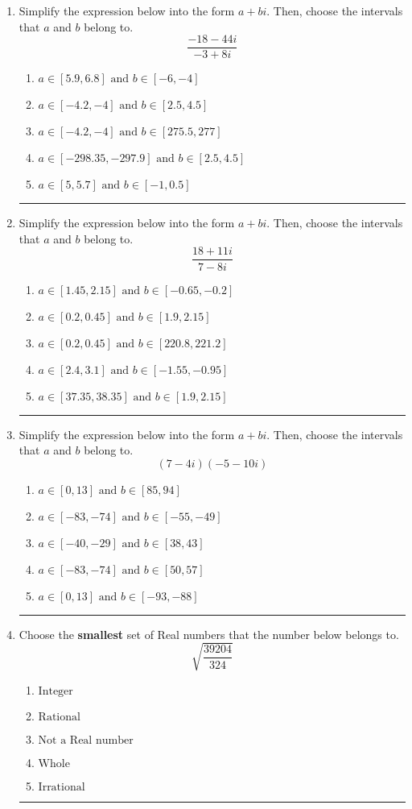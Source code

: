 \documentclass[14pt]{extbook}
\newcommand{\litem}[1]{\item#1\hspace*{-1cm}\rule{\textwidth}{0.4pt}}
\begin{document}
\begin{enumerate}
\litem{
Simplify the expression below into the form $a+bi$. Then, choose the intervals that $a$ and $b$ belong to.\[ \frac{-18 - 44 i}{-3 + 8 i} \]\begin{enumerate}[label=\Alph*.]
\item \( a \in [5.9, 6.8] \text{ and } b \in [-6, -4] \)
\item \( a \in [-4.2, -4] \text{ and } b \in [2.5, 4.5] \)
\item \( a \in [-4.2, -4] \text{ and } b \in [275.5, 277] \)
\item \( a \in [-298.35, -297.9] \text{ and } b \in [2.5, 4.5] \)
\item \( a \in [5, 5.7] \text{ and } b \in [-1, 0.5] \)

\end{enumerate} }
\litem{
Simplify the expression below into the form $a+bi$. Then, choose the intervals that $a$ and $b$ belong to.\[ \frac{18 + 11 i}{7 - 8 i} \]\begin{enumerate}[label=\Alph*.]
\item \( a \in [1.45, 2.15] \text{ and } b \in [-0.65, -0.2] \)
\item \( a \in [0.2, 0.45] \text{ and } b \in [1.9, 2.15] \)
\item \( a \in [0.2, 0.45] \text{ and } b \in [220.8, 221.2] \)
\item \( a \in [2.4, 3.1] \text{ and } b \in [-1.55, -0.95] \)
\item \( a \in [37.35, 38.35] \text{ and } b \in [1.9, 2.15] \)

\end{enumerate} }
\litem{
Simplify the expression below into the form $a+bi$. Then, choose the intervals that $a$ and $b$ belong to.\[ (7 - 4 i)(-5 - 10 i) \]\begin{enumerate}[label=\Alph*.]
\item \( a \in [0, 13] \text{ and } b \in [85, 94] \)
\item \( a \in [-83, -74] \text{ and } b \in [-55, -49] \)
\item \( a \in [-40, -29] \text{ and } b \in [38, 43] \)
\item \( a \in [-83, -74] \text{ and } b \in [50, 57] \)
\item \( a \in [0, 13] \text{ and } b \in [-93, -88] \)

\end{enumerate} }
\litem{
Choose the \textbf{smallest} set of Real numbers that the number below belongs to.\[ \sqrt{\frac{39204}{324}} \]\begin{enumerate}[label=\Alph*.]
\item \( \text{Integer} \)
\item \( \text{Rational} \)
\item \( \text{Not a Real number} \)
\item \( \text{Whole} \)
\item \( \text{Irrational} \)


\end{enumerate}}
\end{enumerate}
\end{document}
